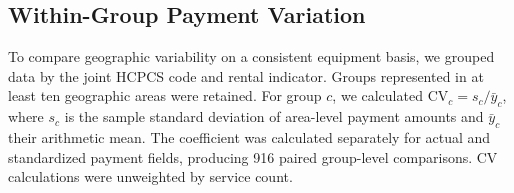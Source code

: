 \subsection{Within-Group Payment Variation}
To compare geographic variability on a consistent equipment basis, we grouped data by the joint HCPCS code and rental indicator. Groups represented in at least ten geographic areas were retained. For group $c$, we calculated $\mathrm{CV}_c=s_c/\bar y_c$, where $s_c$ is the sample standard deviation of area-level payment amounts and $\bar y_c$ their arithmetic mean. The coefficient was calculated separately for actual and standardized payment fields, producing 916 paired group-level comparisons. CV calculations were unweighted by service count.